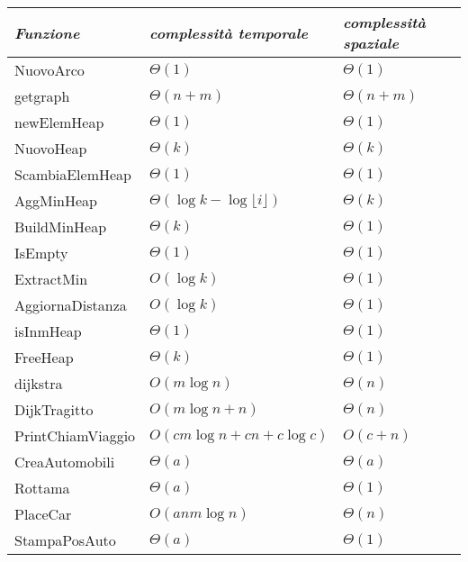 \documentclass[a4paper,11pt]{Article}
\newcommand\T{\rule{0pt}{2.6ex}}       %
\newcommand\B{\rule[-1.2ex]{0pt}{0pt}} %
\begin{document}
\begin{tabular}{p{3.8cm}p{4cm}p{4cm}}
\textit{Funzione} & \textit{complessità temporale} & \textit{complessità spaziale} \B\\
\hline
NuovoArco                       & $\Theta(1)$                     & $\Theta(1)$ \T\\
getgraph                        & $\Theta(n + m)$                 & $\Theta(n + m)$\T \\
newElemHeap\footnotemark[2]     & $\Theta(1)$                     & $\Theta(1)$ \T\\
NuovoHeap\footnotemark[2]       & $\Theta(k)$                     & $\Theta(k)$ \T\\
ScambiaElemHeap\footnotemark[2] & $\Theta(1)$                     & $\Theta(1)$ \T\\
AggMinHeap\footnotemark[2] \footnotemark[3] & $\Theta(\log{k} - \log{\lfloor i \rfloor})$ & $\Theta(k)$ \T \\
BuildMinHeap\footnotemark[2]    & $\Theta(k)$                     & $\Theta(1)$ \T\\
IsEmpty\footnotemark[2]         & $\Theta(1)$                     & $\Theta(1)$ \T\\
ExtractMin\footnotemark[2]      & $O(\log{k})$                    & $\Theta(1)$ \T\\
AggiornaDistanza                & $O(\log{k})$                    & $\Theta(1)$ \T\\
isInmHeap                       & $\Theta(1)$                     & $\Theta(1)$ \T\\
FreeHeap                        & $\Theta(k)$                     & $\Theta(1)$ \T\\
dijkstra                        & $O(m\log{n})$                   & $\Theta(n)$ \T\\
DijkTragitto                    & $O(m\log{n} + n)$               & $\Theta(n)$ \T\\
PrintChiamViaggio               & $O(cm\log{n} +cn + c\log{c})$   & $O(c + n)$ \T\\
CreaAutomobili                  & $\Theta(a)$                     & $\Theta(a)$ \T\\
Rottama                         & $\Theta(a)$                     & $\Theta(1)$ \T\\
PlaceCar                        & $O(anm\log{n})$                 & $\Theta(n)$ \T\\
StampaPosAuto                   & $\Theta(a)$                     & $\Theta(1)$ \T\\

\end{tabular}
\end{document}
